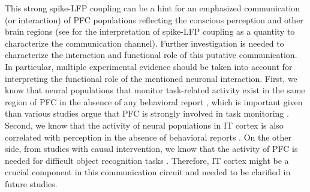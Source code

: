 This strong spike-LFP coupling can be a hint for an emphasized communication (or interaction) of PFC populations reflecting the conscious perception and other brain regions
(see \citet{buzsakiWhatDoesGamma2015} for the interpretation of spike-LFP coupling as a quantity to characterize the communication channel).
Further investigation is needed to characterize the interaction and functional role of this putative communication.
In particular, multiple experimental evidence should be taken into account for interpreting the functional role of the mentioned neuronal interaction.
First, we know that neural populations that monitor task-related activity exist in the same region of PFC in the absence of any behavioral report \citep{kapoorParallelFunctionallySegregated2018},
which is important given than various studies argue that PFC is strongly involved in task monitoring \cite{frassleBinocularRivalryFrontal2014}.
Second, we know that the activity of neural populations in IT cortex is also correlated with perception in the absence of behavioral reports \cite{hesseNewNoreportParadigm2020}.
On the other side, from studies with causal intervention, we know that the activity of PFC is needed for difficult object recognition tasks \cite{karFastRecurrentProcessing2020}.
Therefore, IT cortex might be a crucial component in this communication circuit and needed to be clarified in future studies.

